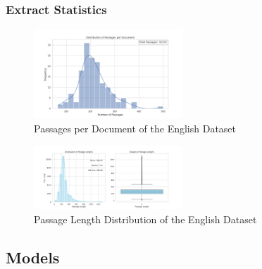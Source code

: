\documentclass{beamer}
\begin{document}
\begin{frame}
  \frametitle{Extract Statistics}

  \begin{figure}
    \includegraphics[width=0.5\textwidth]{Grafiken/IndexEnglish_Passages_Distribution.png}
    \caption{Passages per Document of the English Dataset}
  \end{figure}

  \begin{figure}
    \includegraphics[width=0.5\textwidth]{Grafiken/IndexEnglish_Passage_Length_Statistics.png}
    \caption{Passage Length Distribution of the English Dataset} 
  \end{figure}

\end{frame}

\subsection{Models}
\end{document}
